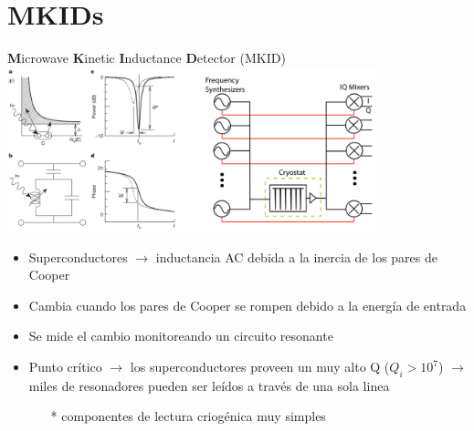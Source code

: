 \documentclass[ignorenonframetext,12pt]{beamer}
\begin{document}
\section{MKIDs}
\begin{frame}{\textbf{M}icrowave \textbf{K}inetic \textbf{I}nductance
				\textbf{D}etector (MKID)}
				\centering
												\qquad \includegraphics[width=0.8\textwidth]{concepto_mkid1}
				\begin{itemize}
								\item \footnotesize{Superconductores $\to$ inductancia AC debida a la
												inercia de los pares de Cooper}
								\item Cambia cuando los pares de Cooper se rompen debido a la
												energía de entrada
								\item Se mide el cambio monitoreando un circuito resonante
								\item Punto crítico $\to$ los \alert{superconductores proveen un muy
												alto Q} ($Q_i > 10^7$) $\to$ miles de resonadores
												pueden ser leídos a través de una sola linea 
												\begin{itemize}
																\item[*] \scriptsize{{\color{blue}componentes de lectura criogénica muy
																				simples}}
												\end{itemize}
				\end{itemize}

\end{frame}
\end{document}
